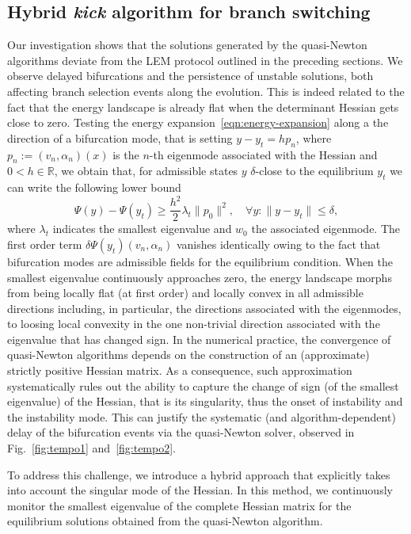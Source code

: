 \documentclass[10pt]{article}
\begin{document}
\subsection{Hybrid \emph{kick} algorithm  for branch switching}
Our investigation shows that the solutions generated by the quasi-Newton algorithms deviate from the LEM protocol outlined in the preceding sections. We observe delayed bifurcations and the persistence of unstable solutions, {both affecting} branch selection events along the evolution.  This is indeed related to the fact that the energy landscape is already flat when the determinant Hessian gets close to zero.
Testing the energy expansion~\eqref{eqn:energy-expansion}
along a the direction of a bifurcation mode, that is setting $y-y_t=h p_n$, where $p_n:=(v_n, \alpha_n)(x)$ is the $n$-th eigenmode associated with  the Hessian and $0<h\in \mathbb R$, we obtain that, for admissible states $y$ $\delta$-close to the equilibrium $y_t$ we can write the following lower bound
$$
    \Psi(y)-\Psi(y_t)\geq \frac{h^2}{2}\lambda_t \|p_0\|^2, \quad \forall y: \|y - y_t\| \leq \delta,
$$
%
where $\lambda_t$ indicates the smallest eigenvalue and $w_0$ the associated eigenmode. The first order term $\delta\Psi(y_t)(v_n, \alpha_n)$ vanishes identically owing to the fact that bifurcation modes are admissible fields for the equilibrium condition.
When the smallest eigenvalue continuously approaches zero, the energy landscape morphs from being locally flat (at first order) and locally convex in all admissible directions including, in particular, the directions associated with  the eigenmodes, to loosing local convexity in the one non-trivial direction associated with  the eigenvalue that has changed sign.
In the numerical practice,
the convergence of quasi-Newton algorithms depends on the construction of an (approximate) strictly positive Hessian matrix.
As a consequence, such approximation systematically rules out the ability to capture the change of sign (of the smallest eigenvalue) of the Hessian, that is its singularity, thus the onset of instability and the instability mode.
This can justify the systematic (and algorithm-dependent) delay of the bifurcation events via the quasi-Newton solver, observed in Fig.~\ref{fig:tempo1} and~\ref{fig:tempo2}.

To address this challenge, we introduce a hybrid approach {that explicitly takes into account the singular mode of the Hessian}. In this method, we continuously monitor the smallest eigenvalue of the complete {Hessian} matrix for the equilibrium solutions obtained from the quasi-Newton algorithm.
%
\end{document}
